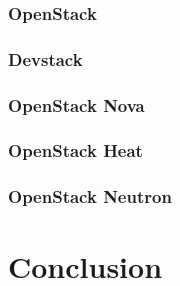 \subsubsection{OpenStack}

\subsubsection{Devstack}

\subsubsection{OpenStack Nova}

\subsubsection{OpenStack Heat}

\subsubsection{OpenStack Neutron}

\section{Conclusion}